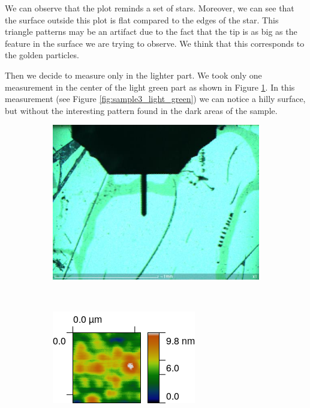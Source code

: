\documentclass[11pt,a4paper]{article}
\begin{document}
We can observe that the plot reminds a set of stars. Moreover, we can see that the surface outside this plot is flat compared to the edges of the star. This triangle patterns may be an artifact due to the fact that the tip is as big as the feature in the surface we are trying to observe. We think that this corresponds to the golden particles.

Then we decide to measure only in the lighter part. We took only one measurement in the center of the light green part as shown in Figure \ref{fig:sample3_light_green_cam}. In this measurement (see Figure \ref{fig:sample3_light_green}) we can notice a hilly surface, but without the interesting pattern found in the dark areas of the sample.

\begin{figure}[H]
\centering
\begin{subfigure}[b]{0.4\textwidth}
\includegraphics[width=\textwidth]{sm_sample3_set}
\caption{}
\label{fig:sample3_light_green_cam}
\end{subfigure}\\
\begin{subfigure}[b]{0.45\textwidth}
\includegraphics[width=\textwidth]{sm_sample3}

\end{subfigure}
\end{figure}
\end{document}
